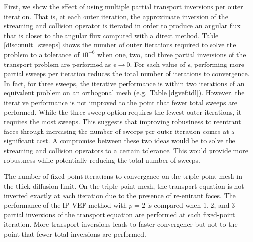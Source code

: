 \documentclass[../doc.tex]{subfiles}
\begin{document}
First, we show the effect of using multiple partial transport inversions per outer iteration. That is, at each outer iteration, the approximate inversion of the streaming and collision operator is iterated in order to produce an angular flux that is closer to the angular flux computed with a direct method. Table \ref{disc:mult_sweeps} shows the number of outer iterations required to solve the problem to a tolerance of $10^{-6}$ when one, two, and three partial inversions of the transport problem are performed as $\epsilon \rightarrow 0$. For each value of $\epsilon$, performing more partial sweeps per iteration reduces the total number of iterations to convergence. In fact, for three sweeps, the iterative performance is within two iterations of an equivalent problem on an orthogonal mesh (e.g.~Table \ref{dgvef:tdl}). However, the iterative performance is not improved to the point that fewer total sweeps are performed. While the three sweep option requires the fewest outer iterations, it requires the most sweeps. This suggests that improving robustness to reentrant faces through increasing the number of sweeps per outer iteration comes at a significant cost. A compromise between these two ideas would be to solve the streaming and collision operators to a certain tolerance. This would provide more robustness while potentially reducing the total number of sweeps. 
\begin{table}
\centering
\caption{The number of fixed-point iterations to convergence on the triple point mesh in the thick diffusion limit. On the triple point mesh, the transport equation is not inverted exactly at each iteration due to the presence of re-entrant faces. The performance of the IP VEF method with $p=2$ is compared when 1, 2, and 3 partial inversions of the transport equation are performed at each fixed-point iteration. More transport inversions leads to faster convergence but not to the point that fewer total inversions are performed. }
\label{disc:mult_sweeps}

\end{table}
\end{document}
